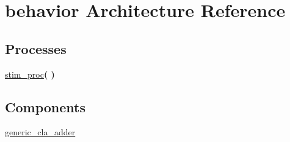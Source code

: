 \hypertarget{classtb__generic__cla__adder_1_1behavior}{\section{behavior Architecture Reference}
\label{classtb__generic__cla__adder_1_1behavior}
}
\subsection*{Processes}
 \begin{DoxyCompactItemize}
\item 
\hyperlink{classtb__generic__cla__adder_1_1behavior_ad2efa6785cff833c341e27596b21aeb5}{stim\+\_\+proc}{\bfseries  (  )}
\end{DoxyCompactItemize}
\subsection*{Components}
 \begin{DoxyCompactItemize}
\item 
\hyperlink{classtb__generic__cla__adder_1_1behavior_ae7148956d4ef1d1cd14f35060634b9c3}{generic\+\_\+cla\+\_\+adder}  {\bfseries }  
\end{DoxyCompactItemize}
